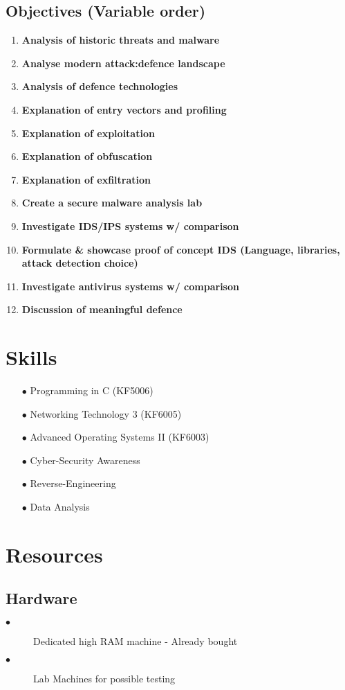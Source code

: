 \subsection{Objectives (Variable order)}
\begin{enumerate}
	\item \textbf{Analysis of historic threats and malware}
	\item \textbf{Analyse modern attack:defence landscape}
	\item \textbf{Analysis of defence technologies}
	\item \textbf{Explanation of entry vectors and profiling}
	\item \textbf{Explanation of exploitation}
	\item \textbf{Explanation of obfuscation}
	\item \textbf{Explanation of exfiltration}
	\item \textbf{Create a secure malware analysis lab}
	\item \textbf{Investigate IDS/IPS systems w/ comparison}
	\item \textbf{Formulate & showcase proof of concept IDS (Language, libraries, attack detection choice)}
	\item \textbf{Investigate antivirus systems w/ comparison}
	\item \textbf{Discussion of meaningful defence}
\end{enumerate}

\section{Skills}
\begin{enumerate}
	\item [$\bullet$] Programming in C (KF5006)
	\item [$\bullet$] Networking Technology 3 (KF6005)
	\item [$\bullet$] Advanced Operating Systems II (KF6003)
	\item [$\bullet$] Cyber-Security Awareness
	\item [$\bullet$] Reverse-Engineering
	\item [$\bullet$] Data Analysis
\end{enumerate}

\section{Resources}
\subsection{Hardware}
\begin{description}
	\item[$\bullet$] Dedicated high RAM machine - Already bought
	\item[$\bullet$] Lab Machines for possible testing
\end{description}

